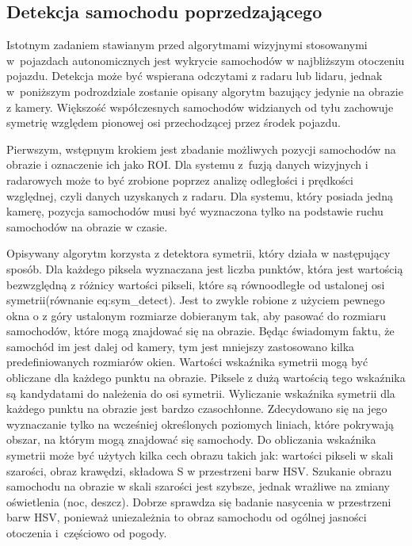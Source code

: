 


\subsection{Detekcja samochodu poprzedzającego}
\label{sec:car_general}

Istotnym zadaniem stawianym przed algorytmami wizyjnymi stosowanymi w~pojazdach autonomicznych jest wykrycie samochodów w najbliższym otoczeniu pojazdu. 
Detekcja może być wspierana odczytami z radaru lub lidaru, jednak w~poniższym podrozdziale zostanie opisany algorytm bazujący jedynie na obrazie z kamery. %
Większość współczesnych samochodów widzianych od tyłu zachowuje symetrię względem pionowej osi przechodzącej przez środek pojazdu. 

Pierwszym, wstępnym krokiem jest zbadanie możliwych pozycji samochodów na obrazie i oznaczenie ich jako ROI.
Dla systemu z~fuzją danych wizyjnych i radarowych może to być zrobione poprzez analizę odległości i prędkości względnej, czyli danych uzyskanych z radaru. 
Dla systemu, który posiada jedną kamerę, pozycja samochodów musi być wyznaczona tylko na podstawie ruchu samochodów na obrazie w czasie.

Opisywany algorytm korzysta z detektora symetrii, który działa w następujący sposób. 
Dla każdego piksela wyznaczana jest liczba punktów, która jest wartością bezwzględną z różnicy wartości pikseli, które są równoodległe od ustalonej osi symetrii(równanie {eq:sym_detect}). %
Jest to zwykle robione z użyciem pewnego okna o z góry ustalonym rozmiarze dobieranym tak, aby pasować do rozmiaru samochodów, które mogą znajdować się na obrazie. 
Będąc świadomym faktu, że samochód im jest dalej od kamery, tym jest mniejszy zastosowano kilka predefiniowanych rozmiarów okien. 
Wartości wskaźnika symetrii mogą być obliczane dla każdego punktu na obrazie. 
Piksele z dużą wartością tego wskaźnika są kandydatami do należenia do osi symetrii. %
Wyliczanie wskaźnika symetrii dla każdego punktu na obrazie jest bardzo czasochłonne. Zdecydowano się na jego wyznaczanie tylko na wcześniej określonych poziomych liniach, które pokrywają obszar, na którym mogą znajdować się samochody. %
Do obliczania wskaźnika symetrii może być użytych kilka cech obrazu takich jak: wartości pikseli w skali szarości, obraz krawędzi, składowa S w przestrzeni barw HSV. 
Szukanie obrazu samochodu na obrazie w skali szarości jest szybsze, jednak wrażliwe na zmiany oświetlenia (noc, deszcz). 
Dobrze sprawdza się badanie nasycenia w przestrzeni barw HSV, ponieważ uniezależnia to obraz samochodu od ogólnej jasności otoczenia i~częściowo od pogody.

